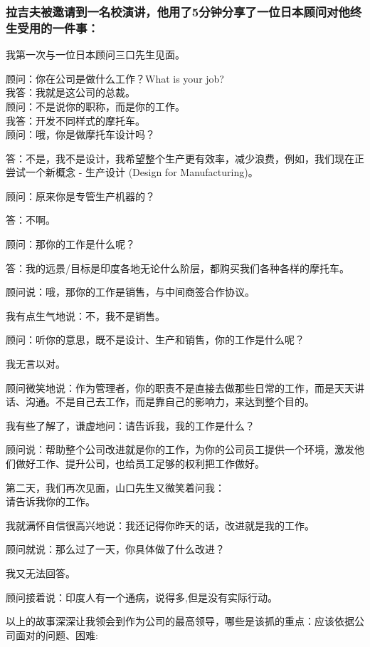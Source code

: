 \hypertarget{ux603bux7ed3}{%
\subsubsection{拉吉夫被邀请到一名校演讲，他用了5分钟分享了一位日本顾问对他终生受用的一件事：}\label{ux603bux7ed3}}


我第一次与一位日本顾问三口先生见面。

顾问：你在公司是做什么工作？What is your job?\\
我答：我就是这公司的总裁。\\
顾问：不是说你的职称，而是你的工作。\\
我答：开发不同样式的摩托车。\\
顾问：哦，你是做摩托车设计吗？

答：不是，我不是设计，我希望整个生产更有效率，减少浪费，例如，我们现在正尝试一个新概念
- 生产设计 (Design for Manufacturing)。

顾问：原来你是专管生产机器的？

答：不啊。

顾问：那你的工作是什么呢？

答：我的远景/目标是印度各地无论什么阶层，都购买我们各种各样的摩托车。

顾问说：哦，那你的工作是销售，与中间商签合作协议。

我有点生气地说：不，我不是销售。

顾问：听你的意思，既不是设计、生产和销售，你的工作是什么呢？

我无言以对。

顾问微笑地说：作为管理者，你的职责不是直接去做那些日常的工作，而是天天讲话、沟通。不是自己去工作，而是靠自己的影响力，来达到整个目的。

我有些了解了，谦虚地问：请告诉我，我的工作是什么？

顾问说：帮助整个公司改进就是你的工作，为你的公司员工提供一个环境，激发他们做好工作、提升公司，也给员工足够的权利把工作做好。

第二天，我们再次见面，山口先生又微笑着问我：\\
请告诉我你的工作。

我就满怀自信很高兴地说：我还记得你昨天的话，改进就是我的工作。

顾问就说：那么过了一天，你具体做了什么改进？

我又无法回答。

顾问接着说：印度人有一个通病，说得多,但是没有实际行动。

以上的故事深深让我领会到作为公司的最高领导，哪些是该抓的重点：应该依据公司面对的问题、困难:

